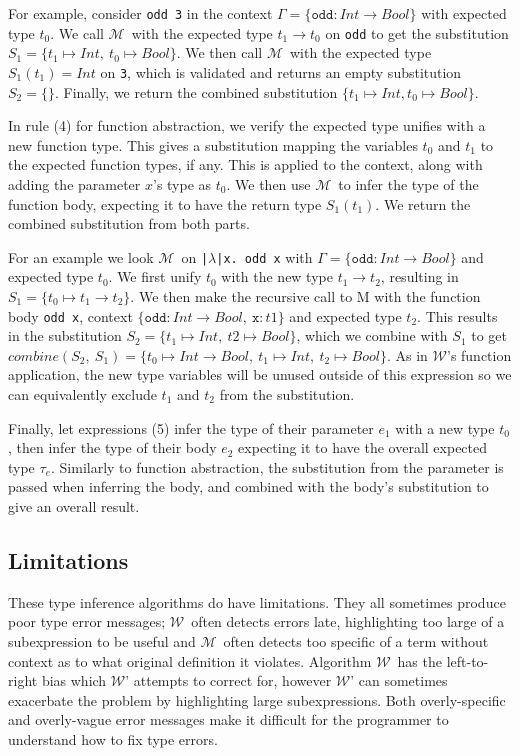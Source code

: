 \documentclass[a4paper,fleqn,oneside,12pt]{report}
\newcommand{\W}{$\mathcal{W}$}
\newcommand{\M}{$\mathcal{M}$}
\begin{document}
For example, consider \texttt{odd 3} in the context $\Gamma = \{ \mathtt{odd} : Int \rightarrow Bool \}$ with expected type $t_0$. We call \M\ with the expected type $t_1 \rightarrow t_0$ on \texttt{odd} to get the substitution $S_1 = \{ t_1 \mapsto Int,\ t_0 \mapsto Bool \}$. We then call \M\ with the expected type $S_1(t_1) = Int$ on \texttt{3}, which is validated and returns an empty substitution $S_2 = \{\}$. Finally, we return the combined substitution $\{ t_1 \mapsto Int, t_0 \mapsto Bool \}$.

In rule (4) for function abstraction, we verify the expected type unifies with a new function type. This gives a substitution mapping the variables $t_0$ and $t_1$ to the expected function types, if any. This is applied to the context, along with adding the parameter $x$’s type as $t_0$. We then use \M\ to infer the type of the function body, expecting it to have the return type $S_1(t_1)$. We return the combined substitution from both parts.

For an example we look \M\ on \texttt{|$\lambda$|x. odd x} with $\Gamma = \{ \mathtt{odd} : Int \rightarrow Bool \}$ and expected type $t_0$. We first unify $t_0$ with the new type $t_1 \rightarrow t_2$, resulting in $S_1 = \{ t_0 \mapsto t_1 \rightarrow t_2 \}$. We then make the recursive call to M with the function body \texttt{odd x}, context $\{ \mathtt{odd} : Int \rightarrow Bool,\ \mathtt{x} : t1 \}$ and expected type $t_2$. This results in the substitution $S_2 = \{ t_1 \mapsto Int,\ t2 \mapsto Bool \}$, which we combine with $S_1$ to get $combine(S_2,\ S_1) = \{ t_0 \mapsto Int \rightarrow Bool,\ t_1 \mapsto Int,\ t_2 \mapsto Bool \}$. As in \W's function application, the new type variables will be unused outside of this expression so we can equivalently exclude $t_1$ and $t_2$ from the substitution.

Finally, let expressions (5) infer the type of their parameter $e_1$ with a new type $t_0$, then infer the type of their body $e_2$ expecting it to have the overall expected type $\tau_e$. Similarly to function abstraction, the substitution from the parameter is passed when inferring the body, and combined with the body’s substitution to give an overall result.

\subsection{Limitations}

These type inference algorithms do have limitations. They all sometimes produce poor type error messages; \W\ often detects errors late, highlighting too large of a subexpression to be useful and \M\ often detects too specific of a term without context as to what original definition it violates. Algorithm \W\ has the left-to-right bias which \W' attempts to correct for, however \W' can sometimes exacerbate the problem by highlighting large subexpressions. Both overly-specific and overly-vague error messages make it difficult for the programmer to understand how to fix type errors.
\end{document}
